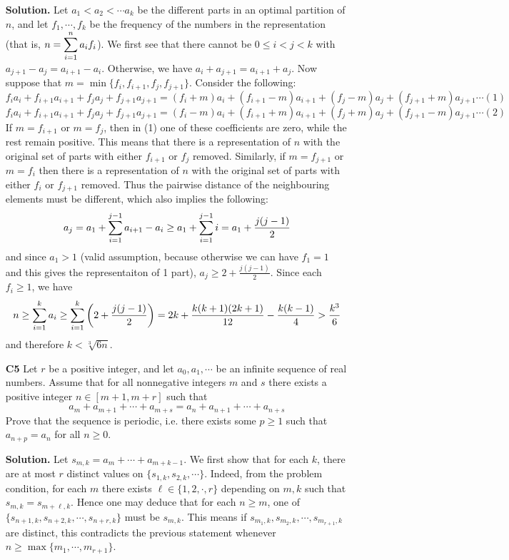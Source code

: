 \documentclass[11pt,a4paper]{article}
\begin{document}
\begin{enumerate}
	\textbf{Solution.} Let $a_1<a_2<\cdots a_k$ be the different parts in an optimal partition of $n$, and let $f_1, \cdots , f_k$ be the frequency of the numbers in the representation 
	(that is, $n=\dsum_{i=1}^n a_if_i$). 
	We first see that there cannot be $0\le i< j < k$ with $a_{j+1}-a_j=a_{i+1}-a_i$. 
	Otherwise, we have $a_i+a_{j+1}=a_{i+1}+a_j$. 
	Now suppose that $m = \min\{f_i, f_{i+1}, f_j, f_{j+1}\}$. Consider the following:
	\[f_ia_i+f_{i+1}a_{i+1}+f_ja_j+f_{j+1}a_{j+1}
	=(f_i+m)a_i+(f_{i+1}-m)a_{i+1}+(f_j-m)a_j+(f_{j+1}+m)a_{j+1}\cdots (1)
	\]
	\[f_ia_i+f_{i+1}a_{i+1}+f_ja_j+f_{j+1}a_{j+1}
	=(f_i-m)a_i+(f_{i+1}+m)a_{i+1}+(f_j+m)a_j+(f_{j+1}-m)a_{j+1}\cdots (2)
	\]
	If $m=f_{i+1}$ or $m=f_j$, then in (1) one of these coefficients are zero, while the rest remain positive. This means that there is a representation of $n$ with the original set of parts with either $f_{i+1}$ or $f_j$ removed. 
	Similarly, if $m=f_{j+1}$ or $m=f_i$ then there is a representation of $n$ with the original set of parts with either $f_i$ or $f_{j+1}$ removed. 
	Thus the pairwise distance of the neighbouring elements must be different, which also implies the following: 
	\[a_j=a_1+\dsum_{i=1}^{j-1}a_{i+1}-a_i\ge a_1+\dsum_{i=1}^{j-1}i=a_1+\frac{j(j-1)}{2}
	\]
	and since $a_1>1$ (valid assumption, because otherwise we can have $f_1=1$ and this gives the representaiton of 1 part), $a_j\ge 2+\frac{j(j-1)}{2}$. Since each $f_i\ge 1$, we have 
	\[
	n\ge \dsum_{i=1}^k a_i
	\ge \dsum_{i=1}^k \left(2 + \frac{j(j-1)}{2}\right)
	=2k+\frac{k(k+1)(2k+1)}{12}-\frac{k(k-1)}{4}
	>\frac{k^3}{6}
	\]
	and therefore $k<\sqrt[3]{6n}$. 
	
	\item[\textbf {C5}]Let $r$ be a positive integer, and let $a_0 , a_1 , \cdots $ be an infinite sequence of real numbers. Assume that for all nonnegative integers $m$ and $s$ there exists a positive integer $n \in [m+1, m+r]$ such that
	\[ a_m + a_{m+1} +\cdots +a_{m+s} = a_n + a_{n+1} +\cdots +a_{n+s} \]
	Prove that the sequence is periodic, i.e. there exists some $p \ge 1 $ such that $a_{n+p} =a_n $ for all $n \ge 0$.
	
	\textbf{Solution.} 
	Let $s_{m, k} = a_m + \cdots + a_{m + k - 1}$. 
	We first show that for each $k$, there are at most $r$ distinct values on $\{s_{1, k}, s_{2, k}, \cdots\}$. 
	Indeed, from the problem condition, for each $m$ there exists $\ell \in \{1, 2, \cdot, r\}$ depending on $m, k$ 
	such that $s_{m, k}=s_{m+\ell, k}$. 
	Hence one may deduce that for each $n\ge m$, one of $\{s_{n+1, k}, s_{n+2, k}, \cdots , s_{n+r, k}\}$ must be $s_{m, k}$. 
	This means if $s_{m_1, k}, s_{m_2, k}, \cdots, s_{m_{r+1}, k}$ are distinct, 
	this contradicts the previous statement whenever $n \ge \max \{m_1, \cdots, m_{r+1}\}$. 
	

\end{enumerate}
\end{document}
